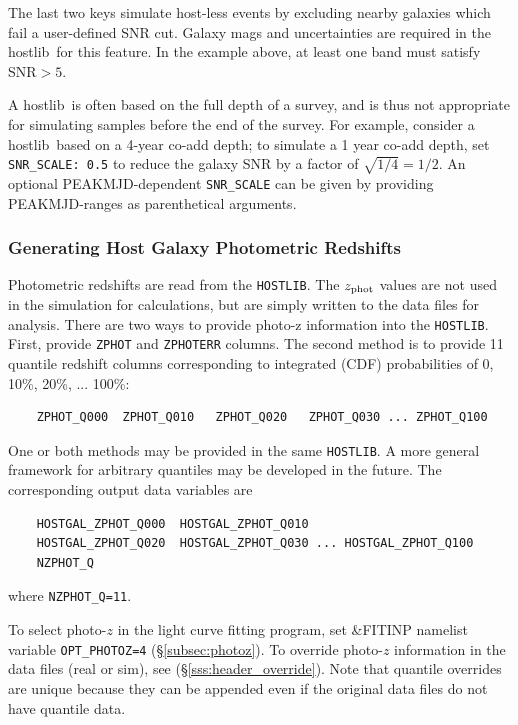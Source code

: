 \documentclass[12pt]{article}
\newcommand{\hostlib}{{\sc hostlib}}
\newcommand{\Zphot}{z_{\rm phot}}
\begin{document}
{The last two keys simulate host-less events by excluding nearby galaxies
which fail a user-defined SNR cut.
Galaxy mags and uncertainties are required in the
\hostlib\ for this feature. 
In the example above, at least one band must satisfy SNR$>5$.

A \hostlib\ is often based on the full depth of a survey,
and is thus not appropriate for simulating samples before
the end of the survey.
For example, consider a \hostlib\ based on a 4-year co-add depth;
to simulate a 1 year co-add depth, set {\tt SNR\_SCALE: 0.5}
to reduce the galaxy SNR by a factor of $\sqrt{1/4}=1/2$.
An optional PEAKMJD-dependent {\tt SNR\_SCALE} can be given
by providing PEAKMJD-ranges as parenthetical arguments.

\subsubsection{Generating Host Galaxy Photometric Redshifts}
\label{sss:quantiles}

Photometric redshifts are read from the {\tt HOSTLIB}.
The $\Zphot$ values are not used in the simulation for calculations,
but are simply written to the data files for analysis.
There are two ways to provide photo-z information into the {\tt HOSTLIB}.
First, provide {\tt ZPHOT} and {\tt ZPHOTERR} columns.
The second method is to provide 11 quantile redshift columns 
corresponding to integrated (CDF) probabilities of 
0, 10\%, 20\%, ... 100\%:
\begin{verbatim}
    ZPHOT_Q000  ZPHOT_Q010   ZPHOT_Q020   ZPHOT_Q030 ... ZPHOT_Q100
\end{verbatim}
One or both methods may be provided in the same {\tt HOSTLIB}.
A more general framework for arbitrary quantiles may be developed in the
future. 
The corresponding output data variables are
\begin{verbatim} 
    HOSTGAL_ZPHOT_Q000  HOSTGAL_ZPHOT_Q010   
    HOSTGAL_ZPHOT_Q020  HOSTGAL_ZPHOT_Q030 ... HOSTGAL_ZPHOT_Q100 
    NZPHOT_Q
\end{verbatim}
%
where {\tt NZPHOT\_Q=11}.

To select photo-$z$ in the light curve fitting program,
set {\&FITINP} namelist variable {\tt OPT\_PHOTOZ=4}
(\S\ref{subsec:photoz}). To override photo-$z$ information
in the data files (real or sim), 
see (\S\ref{sss:header_override}).
Note that quantile overrides are unique because they can
be appended even if the original data files do not have
quantile data.

\clearpage
}
\end{document}
